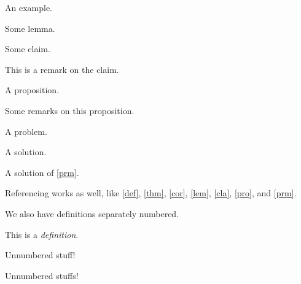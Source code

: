 \documentclass{article}
\begin{document}
\begin{example}[An example]
    An example. \lipsum[8]
\end{example}

\begin{lemma}
    \label{lem}%
    Some lemma. \lipsum[9]
\end{lemma}

\begin{claim}
    \label{cla}%
    Some claim. \lipsum[10]
\end{claim}

\begin{remark}
    This is a remark on the claim. \lipsum[11]
\end{remark}

\begin{proposition}
    \label{pro}%
    A proposition. \lipsum[12]
\end{proposition}

\begin{remarks}
    Some remarks on this proposition. \lipsum[13]
\end{remarks}

\begin{problem}
    \label{prm}%
    A problem. \lipsum[14]
\end{problem}

\begin{solution}
    A solution. \lipsum[15]
\end{solution}

\begin{solution}
    A solution of \autoref{prm}. \lipsum[16]
\end{solution}

Referencing works as well, like \autoref{def}, \autoref{thm}, \autoref{cor}, \autoref{lem}, \autoref{cla}, \autoref{pro}, and \autoref{prm}.

We also have definitions separately numbered.

\begin{definition*}
    \label{defs}%
    This is a \emph{definition}. \lipsum[1]
\end{definition*}

\begin{example*}
    Unnumbered stuff! \lipsum[17]
\end{example*}

\begin{examples*}
    Unnumbered stuffs! \lipsum[18]
\end{examples*}
\end{document}
